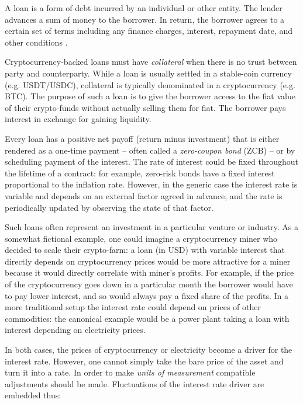 \documentclass[runningheads]{llncs}
\begin{document}
A loan is a form of debt incurred by an individual or other entity.
The lender advances a sum of money to the borrower. In return, the
borrower agrees to a certain set of terms including any finance charges,
interest, repayment date, and other conditions \cite{loan}.

Cryptocurrency-backed loans must have \emph{collateral} when there is no trust
between party and counterparty. While a loan is usually settled in a
stable-coin currency (e.g. USDT/USDC), collateral is typically denominated
in a cryptocurrency (e.g. BTC). The purpose of such a loan is to give
the borrower access to the fiat value of their crypto-funds without
actually selling them for fiat. The borrower pays interest in exchange
for gaining liquidity.

Every loan has a positive net payoff (return minus investment) that
is either rendered as a one-time payment -- often called a \emph{zero-coupon bond} (ZCB) -- or by scheduling
payment of the interest. The rate of interest could be fixed throughout
the lifetime of a contract: for example, zero-risk bonds have a fixed
interest proportional to the inflation rate.
However, in the generic case the interest rate is variable and depends
on an external factor agreed in advance, and the rate is periodically
updated by observing the state of that factor. 

Such loans often represent an investment in a particular venture or industry. As
a somewhat fictional example, one could imagine a cryptocurrency miner
who decided to scale their crypto-farm: a loan (in USD) with variable
interest that directly depends on cryptocurrency prices would be more
attractive for a miner because it would directly correlate with miner's
profits. For example, if the price of the cryptocurrency goes down
in a particular month the borrower would have to pay lower interest, and so would always pay a fixed share of the profits. In a more traditional
setup the interest rate could depend on prices of other commodities: the canonical example would be a power plant taking a loan
with interest depending on electricity prices. 

In both cases, the prices of
cryptocurrency or electricity become a driver for the interest
rate.
However, one cannot simply take the bare price of the asset and turn
it into a rate. In order to make \emph{units of measurement} compatible
adjustments should be made. Fluctuations of the interest rate driver
are embedded thus:

\end{document}
